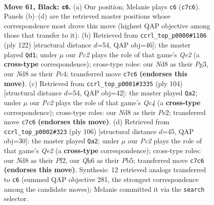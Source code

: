 \documentclass[11pt]{article}
\begin{document}
\clearpage

\begin{figure}[p]\centering
\begin{subfigure}{0.46\textwidth}\centering
\resizebox{\linewidth}{!}{%
\newchessgame
\chessboard[
  setfen={2kn4/p1p3p1/1p4pq/2pQ4/8/2P5/KP6/8 b - - 23 61},
  showmover=false,
  pgfstyle=straightmove, color=movearrow, markmove={c7-c6}
]}
\caption{}
\end{subfigure}\hfill
\begin{subfigure}{0.46\textwidth}\centering
\resizebox{\linewidth}{!}{%
\newchessgame
\chessboard[
  setfen={8/5pk1/4p3/p1p5/2P5/1Pq3P1/4QPK1/8 w - - 7 62},
  showmover=false,
  pgfstyle=straightmove, color=movearrow, markmove={e2-d1}
]}
\caption{}
\end{subfigure}
\\[4pt]
\begin{subfigure}{0.46\textwidth}\centering
\resizebox{\linewidth}{!}{%
\newchessgame
\chessboard[
  setfen={5k2/4p3/5pp1/7p/2Q4P/4qPP1/4P1K1/8 w - - 2 53},
  showmover=false,
  pgfstyle=straightmove, color=movearrow, markmove={c4-a2}
]}
\caption{}
\end{subfigure}\hfill
\begin{subfigure}{0.46\textwidth}\centering
\resizebox{\linewidth}{!}{%
\newchessgame
\chessboard[
  setfen={5k2/5p2/1p2p2p/1P6/2Pq4/6P1/4QP1K/8 w - - 3 54},
  showmover=false,
  pgfstyle=straightmove, color=movearrow, markmove={e2-a2}
]}
\caption{}
\end{subfigure}
\caption{\textbf{Move 61, Black: \texttt{c6}.} (a) Our position; Melanie plays \texttt{c6} (\texttt{c7c6}). Panels (b)--(d) are the retrieved master positions whose correspondence most drove this move (highest QAP objective among those that transfer to it). (b) Retrieved from \texttt{ccrl\_top\_p0000\#1106} (ply 122) [structural distance $d$=54, QAP obj=46]: the master played \texttt{Qd1}; under $\mu$ our \emph{Pc2} plays the role of that game's \emph{Qe2} (a \textbf{cross-type} correspondence); cross-type roles: our \emph{N}d8 as their \emph{P}g3, our \emph{N}d8 as their \emph{P}c4; transferred move \texttt{c7c6} \textbf{(endorses this move)}. (c) Retrieved from \texttt{ccrl\_top\_p0001\#3335} (ply 104) [structural distance $d$=54, QAP obj=42]: the master played \texttt{Qa2}; under $\mu$ our \emph{Pc2} plays the role of that game's \emph{Qc4} (a \textbf{cross-type} correspondence); cross-type roles: our \emph{N}d8 as their \emph{P}e2; transferred move \texttt{c7c6} \textbf{(endorses this move)}. (d) Retrieved from \texttt{ccrl\_top\_p0002\#323} (ply 106) [structural distance $d$=45, QAP obj=30]: the master played \texttt{Qa2}; under $\mu$ our \emph{Pc2} plays the role of that game's \emph{Qe2} (a \textbf{cross-type} correspondence); cross-type roles: our \emph{N}d8 as their \emph{P}f2, our \emph{Q}h6 as their \emph{P}b5; transferred move \texttt{c7c6} \textbf{(endorses this move)}. Synthesis: 12 retrieved analogs transferred to \texttt{c6} (summed QAP objective 281, the strongest correspondence among the candidate moves); Melanie committed it via the \texttt{search} selector.}
\label{fig:thought-m121}
\end{figure}
\end{document}

